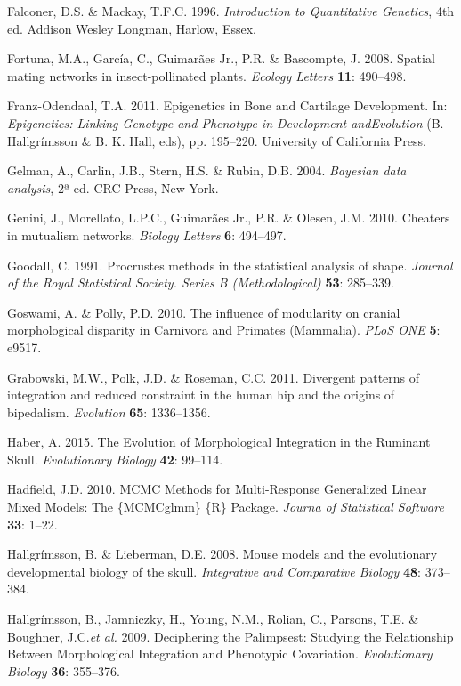 \documentclass[11pt,twoside]{report}
\begin{document}
Falconer, D.S. \& Mackay, T.F.C. 1996. \emph{Introduction to
Quantitative Genetics}, 4th ed. Addison Wesley Longman, Harlow, Essex.

Fortuna, M.A., García, C., Guimarães Jr., P.R. \& Bascompte, J. 2008.
Spatial mating networks in insect-pollinated plants. \emph{Ecology
Letters} \textbf{11}: 490--498.

Franz-Odendaal, T.A. 2011. Epigenetics in Bone and Cartilage
Development. In: \emph{Epigenetics: Linking Genotype and Phenotype in
Development andEvolution} (B. Hallgrímsson \& B. K. Hall, eds), pp.
195--220. University of California Press.

Gelman, A., Carlin, J.B., Stern, H.S. \& Rubin, D.B. 2004.
\emph{Bayesian data analysis}, 2ª ed. CRC Press, New York.

Genini, J., Morellato, L.P.C., Guimarães Jr., P.R. \& Olesen, J.M. 2010.
Cheaters in mutualism networks. \emph{Biology Letters} \textbf{6}:
494--497.

Goodall, C. 1991. Procrustes methods in the statistical analysis of
shape. \emph{Journal of the Royal Statistical Society. Series B
(Methodological)} \textbf{53}: 285--339.

Goswami, A. \& Polly, P.D. 2010. The influence of modularity on cranial
morphological disparity in Carnivora and Primates (Mammalia). \emph{PLoS
ONE} \textbf{5}: e9517.

Grabowski, M.W., Polk, J.D. \& Roseman, C.C. 2011. Divergent patterns of
integration and reduced constraint in the human hip and the origins of
bipedalism. \emph{Evolution} \textbf{65}: 1336--1356.

Haber, A. 2015. The Evolution of Morphological Integration in the
Ruminant Skull. \emph{Evolutionary Biology} \textbf{42}: 99--114.

Hadfield, J.D. 2010. MCMC Methods for Multi-Response Generalized Linear
Mixed Models: The \{MCMCglmm\} \{R\} Package. \emph{Journa of
Statistical Software} \textbf{33}: 1--22.

Hallgrímsson, B. \& Lieberman, D.E. 2008. Mouse models and the
evolutionary developmental biology of the skull. \emph{Integrative and
Comparative Biology} \textbf{48}: 373--384.

Hallgrímsson, B., Jamniczky, H., Young, N.M., Rolian, C., Parsons, T.E.
\& Boughner, J.C.\emph{et al.} 2009. Deciphering the Palimpsest:
Studying the Relationship Between Morphological Integration and
Phenotypic Covariation. \emph{Evolutionary Biology} \textbf{36}:
355--376.
\end{document}
